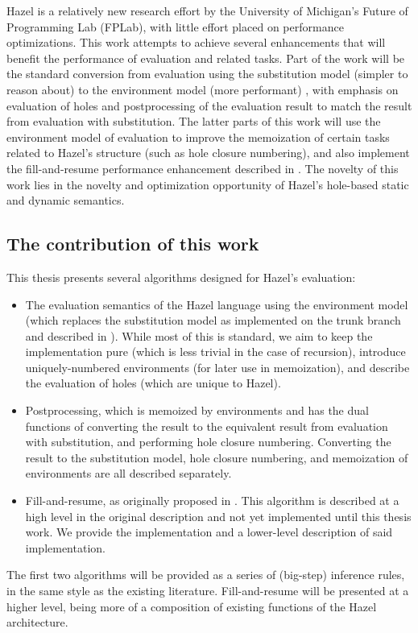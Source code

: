 Hazel is a relatively new research effort by the University of Michigan's Future of Programming Lab (FPLab), with little effort placed on performance optimizations. This work attempts to achieve several enhancements that will benefit the performance of evaluation and related tasks. Part of the work will be the standard conversion from evaluation using the substitution model (simpler to reason about) to the environment model (more performant) , with emphasis on evaluation of holes and postprocessing of the evaluation result to match the result from evaluation with substitution. The latter parts of this work will use the environment model of evaluation to improve the memoization of certain tasks related to Hazel's structure (such as hole closure numbering), and also implement the fill-and-resume performance enhancement described in \cite{conf/popl/HazelnutLive19}. The novelty of this work lies in the novelty and optimization opportunity of Hazel's hole-based static and dynamic semantics.

\subsection{The contribution of this work}
\label{sec:contribution}

This thesis presents several algorithms designed for Hazel's evaluation:
\begin{itemize}
\item The evaluation semantics of the Hazel language using the environment model (which replaces the substitution model as implemented on the trunk branch and described in \cite{conf/popl/HazelnutLive19}). While most of this is standard, we aim to keep the implementation pure (which is less trivial in the case of recursion), introduce uniquely-numbered environments (for later use in memoization), and describe the evaluation of holes (which are unique to Hazel).
\item Postprocessing, which is memoized by environments and has the dual functions of converting the result to the equivalent result from evaluation with substitution, and performing hole closure numbering. Converting the result to the substitution model, hole closure numbering, and memoization of environments are all described separately.
\item Fill-and-resume, as originally proposed in \cite{conf/popl/HazelnutLive19}. This algorithm is described at a high level in the original description and not yet implemented until this thesis work. We provide the implementation and a lower-level description of said implementation.
\end{itemize}
The first two algorithms will be provided as a series of (big-step) inference rules, in the same style as the existing literature. Fill-and-resume will be presented at a higher level, being more of a composition of existing functions of the Hazel architecture.

